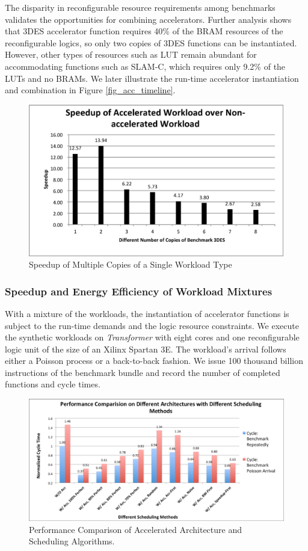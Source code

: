 The disparity in reconfigurable resource requirements among benchmarks
validates the opportunities for combining accelerators. Further
analysis shows that 3DES accelerator function requires 40\% of 
the BRAM resources of the reconfigurable logics, so only two copies of
3DES functions can be instantiated. However, other types of
resources such as LUT remain abundant for accommodating
functions such as SLAM-C, which requires only 9.2\% of the LUTs and no
BRAMs. We later illustrate the run-time accelerator instantiation and combination in Figure
\ref{fig_acc_timeline}.   

\begin{figure}
    \centering
    \includegraphics[width=4.5in]{Increase-Num-of-Apps}
    \caption{Speedup of Multiple Copies of a Single Workload Type}
    \label{fig_num_of_apps}
\end{figure}

\subsubsection{Speedup and Energy Efficiency of Workload Mixtures}

With a mixture of the workloads, the instantiation of accelerator
functions is subject to the run-time demands and the logic resource
constraints. We execute the synthetic workloads on {\em Transformer} with eight
cores and one reconfigurable logic unit of the size of an Xilinx
Spartan 3E. The workload's arrival follows either a Poisson process or
a back-to-back fashion. We issue 100 thousand billion instructions of
the benchmark bundle and record the number of completed functions and
cycle times. 

\begin{figure}
    \centering
    \includegraphics[width=4.5in]{Cycle-8core}
    \caption{Performance Comparison of Accelerated Architecture and Scheduling Algorithms.}
    \label{fig_8core_cycle}
\end{figure}

